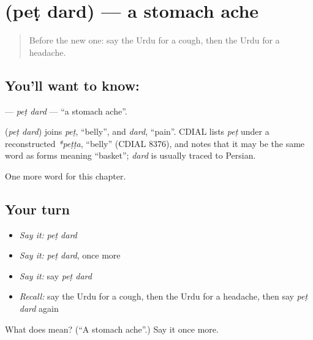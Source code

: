\section[\texorpdfstring{\ur{پیٹ} \ur{درد} (peṭ dard)}{پیٹ درد (peṭ dard)}]{  (peṭ dard) — a stomach ache}

\label{lesson:UR-C152-pet-dard}



\begin{quote}
Before the new one: say the Urdu for a cough, then the Urdu for a headache.
\end{quote}

\subsection*{You'll want to know:  }
\textbf{ } — \emph{peṭ dard} — \textquotedblleft{}a stomach ache\textquotedblright{}.

\begin{cousinweb}
\textbf{ } (\emph{peṭ dard}) joins \emph{peṭ}, \textquotedblleft{}belly\textquotedblright{}, and \emph{dard}, \textquotedblleft{}pain\textquotedblright{}. CDIAL lists \emph{peṭ} under a reconstructed \emph{*peṭṭa}, \textquotedblleft{}belly\textquotedblright{} (CDIAL 8376), and notes that it may be the same word as forms meaning \textquotedblleft{}basket\textquotedblright{}; \emph{dard} is usually traced to Persian.
\end{cousinweb}

\begin{grammarlens}[title={What you've built}]
One more word for this chapter.
\end{grammarlens}

\subsection*{Your turn}
\begin{itemize}
\raggedright
  \item \emph{Say it:} \emph{peṭ dard}
  \item \emph{Say it:} \emph{peṭ dard}, once more
  \item \emph{Say it:} say \emph{peṭ dard}
  \item \emph{Recall:} say the Urdu for a cough, then the Urdu for a headache, then say \emph{peṭ dard} again
\end{itemize}

\begin{tcolorbox}[breakable,colback=teal!4,colframe=teal!35!black,title={Before you move on}]
What does   mean? (\textquotedblleft{}A stomach ache\textquotedblright{}.) Say it once more.
\end{tcolorbox}
